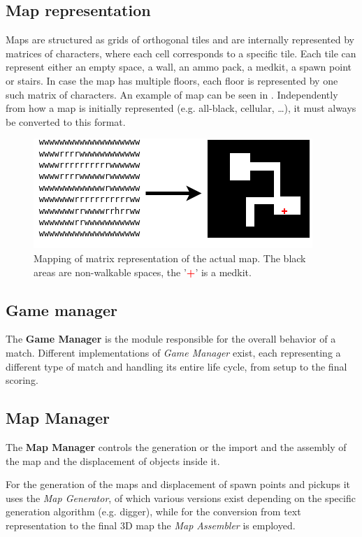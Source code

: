 \subsection{Map representation}
Maps are structured as grids of orthogonal tiles and are internally represented by matrices of characters, where each cell corresponds to a specific tile. Each tile can represent either an empty space, a wall, an ammo pack, a medkit, a spawn point or stairs. 
In case the map has multiple floors, each floor is represented by one such matrix of characters. An example of map can be seen in .
Independently from how a map is initially represented (e.g. all-black, cellular, …), it must always be converted to this format.

\begin{figure}[hbtp]
\centering
\includegraphics[width=0.7\linewidth]{Images/images/charmap.drawio.png}
\caption{Mapping of matrix representation of the actual map. The black areas are non-walkable spaces, the '\textcolor{red}{\textbf{+}}' is a medkit.}
\label{fig:char_map}
\end{figure}


\subsection{Game manager}
The \textbf{Game Manager} is the module responsible for the overall behavior of a match. Different implementations of \textit{Game Manager} exist, each representing a different type of match and handling its entire life cycle, from setup to the final scoring.

\subsection{Map Manager}
The \textbf{Map Manager} controls the generation or the import and the assembly of the map and the displacement of objects inside it.

For the generation of the maps and displacement of spawn points and pickups it uses the \textit{Map Generator}, of which various versions exist depending on the specific generation algorithm (e.g. digger), while for the conversion from text representation to the final 3D map the \textit{Map Assembler} is employed.

